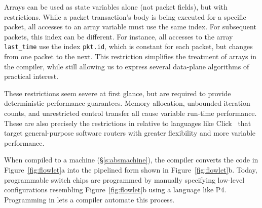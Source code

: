 Arrays can be used as state variables alone (not packet fields), but with
restrictions. While a packet transaction's body is being executed for a
specific packet, all accesses to an array variable must use the same index. For
subsequent packets, this index can be different. For instance, all accesses to
the array \texttt{last\_time} use the index \texttt{pkt.id}, which is constant
for each packet, but changes from one packet to the next. This restriction
simplifies the treatment of arrays in the compiler, while still allowing us to
express several data-plane algorithms of practical interest.

These restrictions seem severe at first glance, but are required to provide
deterministic performance guarantees. Memory allocation, unbounded iteration
counts, and unrestricted control transfer all cause variable run-time
performance. These are also precisely the restrictions in \pktlanguage relative
to languages like Click~\cite{click} that target general-purpose software
routers with greater flexibility and more variable performance.

When compiled to a \absmachine machine (\S\ref{s:absmachine}), the \pktlanguage
compiler converts the code in Figure~\ref{fig:flowlet}a into the pipelined form
shown in Figure~\ref{fig:flowlet}b. Today, programmable switch chips are
programmed by manually specifying low-level configurations resembling
Figure~\ref{fig:flowlet}b using a language like P4. Programming in \pktlanguage
lets a compiler automate this process.
